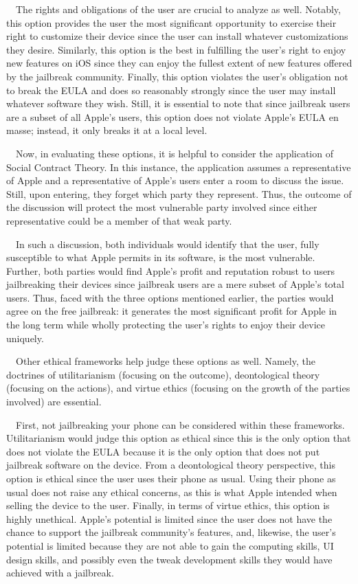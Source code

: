 \documentclass{article}
\begin{document}
\ \ The rights and obligations of the user are crucial to analyze as well. Notably, this option provides the user the
most significant opportunity to exercise their right to customize their device since the user can install whatever
customizations they desire. Similarly, this option is the best in fulfilling the user's right to enjoy new features on
iOS since they can enjoy the fullest extent of new features offered by the jailbreak community. Finally, this option
violates the user's obligation not to break the EULA and does so reasonably strongly since the user may install
whatever software they wish. Still, it is essential to note that since jailbreak users are a subset of all Apple's
users, this option does not violate Apple's EULA en masse; instead, it only breaks it at a local level.


\bigskip

\ \ Now, in evaluating these options, it is helpful to consider the application of Social Contract Theory. In this
instance, the application assumes a representative of Apple and a representative of Apple's users enter a room to
discuss the issue. Still, upon entering, they forget which party they represent. Thus, the outcome of the discussion
will protect the most vulnerable party involved since either representative could be a member of that weak party.

\ \ In such a discussion, both individuals would identify that the user, fully susceptible to what Apple permits in its
software, is the most vulnerable. Further, both parties would find Apple's profit and reputation robust to users
jailbreaking their devices since jailbreak users are a mere subset of Apple's total users. Thus, faced with the three
options mentioned earlier, the parties would agree on the free jailbreak: it generates the most significant profit for
Apple in the long term while wholly protecting the user's rights to enjoy their device uniquely.

\ \ Other ethical frameworks help judge these options as well. Namely, the doctrines of utilitarianism (focusing on the
outcome), deontological theory (focusing on the actions), and virtue ethics (focusing on the growth of the parties
involved) are essential.

\ \ First, not jailbreaking your phone can be considered within these frameworks. Utilitarianism would judge this option
as ethical since this is the only option that does not violate the EULA because it is the only option that does not put
jailbreak software on the device. From a deontological theory perspective, this option is ethical since the user uses
their phone as usual. Using their phone as usual does not raise any ethical concerns, as this is what Apple intended
when selling the device to the user. Finally, in terms of virtue ethics, this option is highly unethical. Apple's
potential is limited since the user does not have the chance to support the jailbreak community's features, and,
likewise, the user's potential is limited because they are not able to gain the computing skills, UI design skills, and
possibly even the tweak development skills they would have achieved with a jailbreak.
\end{document}
